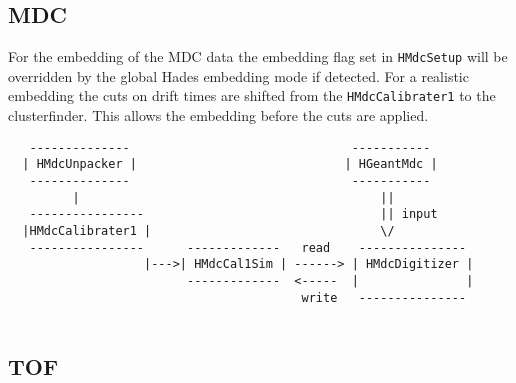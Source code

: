 \subsection{MDC}

For the embedding of the MDC data the embedding flag set in \verb+HMdcSetup+ 
will be overridden by the global Hades embedding mode if detected. For a 
realistic embedding the cuts on drift times are shifted from the \verb+HMdcCalibrater1+ 
to the clusterfinder. This allows the embedding before the cuts are applied.

\begin{lstlisting}
   --------------                               -----------
  | HMdcUnpacker |                             | HGeantMdc |
   --------------                               -----------
         |                                          ||
   ----------------                                 || input 
  |HMdcCalibrater1 |                                \/
   ----------------      -------------   read    ---------------
                   |--->| HMdcCal1Sim | ------> | HMdcDigitizer |
                         -------------  <-----  |               |
                                         write   ---------------
                                         
\end{lstlisting}

\subsection{TOF}

